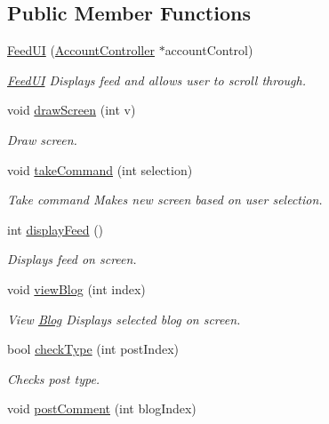 \subsection*{Public Member Functions}
\begin{DoxyCompactItemize}
\item 
\hyperlink{classFeedUI_a2b24cd4cdf154866590d2ce583d688e9}{Feed\+UI} (\hyperlink{classAccountController}{Account\+Controller} $\ast$account\+Control)
\begin{DoxyCompactList}\small\item\em \hyperlink{classFeedUI}{Feed\+UI} Displays feed and allows user to scroll through. \end{DoxyCompactList}\item 
void \hyperlink{classFeedUI_aa95513cfc7b44665cf4a37258b3b45df}{draw\+Screen} (int v)
\begin{DoxyCompactList}\small\item\em Draw screen. \end{DoxyCompactList}\item 
void \hyperlink{classFeedUI_a5e3f1e7bea0c898b95d8b6d461f9bae5}{take\+Command} (int selection)
\begin{DoxyCompactList}\small\item\em Take command Makes new screen based on user selection. \end{DoxyCompactList}\item 
int \hyperlink{classFeedUI_a593dc73d77c0266f85d0472def6f97fb}{display\+Feed} ()
\begin{DoxyCompactList}\small\item\em Displays feed on screen. \end{DoxyCompactList}\item 
void \hyperlink{classFeedUI_a2cae2081d76ad291519568cd344e015a}{view\+Blog} (int index)
\begin{DoxyCompactList}\small\item\em View \hyperlink{classBlog}{Blog} Displays selected blog on screen. \end{DoxyCompactList}\item 
bool \hyperlink{classFeedUI_a4fa2ad966ef73b69b2d30b01ae6c4b4c}{check\+Type} (int post\+Index)
\begin{DoxyCompactList}\small\item\em Checks post type. \end{DoxyCompactList}\item 
void \hyperlink{classFeedUI_aa3946c1d695e02e65faa4556323d3ce0}{post\+Comment} (int blog\+Index)

\end{DoxyCompactItemize}
